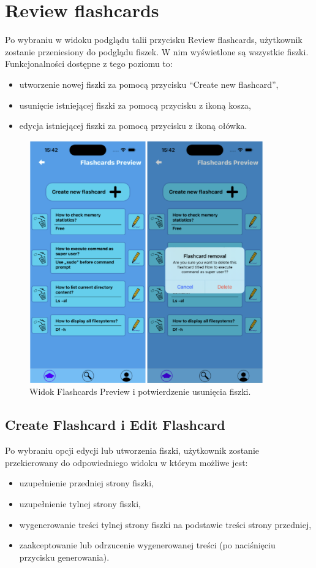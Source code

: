 \section{Review flashcards}
Po wybraniu w widoku podglądu talii przycisku Review flashcards, użytkownik zostanie przeniesiony do podglądu fiszek. W nim wyświetlone są wszystkie fiszki. Funkcjonalności dostępne z tego poziomu to:
\begin{itemize}
    \item utworzenie nowej fiszki za pomocą przycisku “Create new flashcard”,
    \item usunięcie istniejącej fiszki za pomocą przycisku z ikoną kosza,
    \item edycja istniejącej fiszki za pomocą przycisku z ikoną ołówka.
\end{itemize}


\begin{figure}[H]
    \centering
    \includegraphics[width=0.9\textwidth]{chapters/chapter_10/images_mobile/mobile_flashcards_preview}
    \caption{Widok Flashcards Preview i potwierdzenie usunięcia fiszki.}
    \label{img:mobile_flashcards_preview}
\end{figure}


\subsection{Create Flashcard i Edit Flashcard}
Po wybraniu opcji edycji lub utworzenia fiszki, użytkownik zostanie przekierowany do odpowiedniego widoku w którym możliwe jest:
\begin{itemize}
    \item uzupełnienie przedniej strony fiszki,
    \item uzupełnienie tylnej strony fiszki,
    \item wygenerowanie treści tylnej strony fiszki na podstawie treści strony przedniej,
    \item zaakceptowanie lub odrzucenie wygenerowanej treści (po naciśnięciu przycisku generowania).
\end{itemize}


